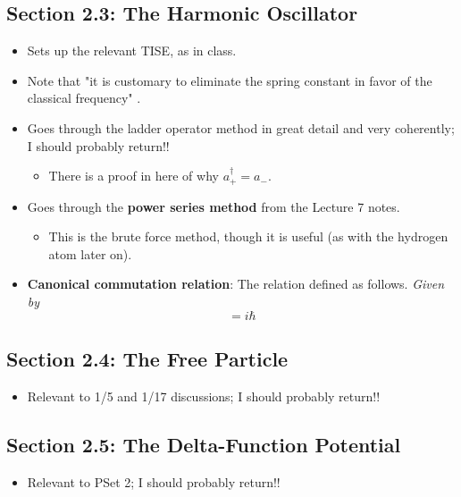 \documentclass[../notes.tex]{subfiles}
\begin{document}
\subsection*{Section 2.3: The Harmonic Oscillator}
\begin{itemize}
    \item {}Sets up the relevant TISE, as in class.
    \item Note that "it is customary to eliminate the spring constant in favor of the classical frequency" \parencite[58]{bib:Griffiths}.
    \item Goes through the ladder operator method in great detail and very coherently; I should probably return!!
    \begin{itemize}
        \item There is a proof in here of why $a_+^\dagger=a_-$.
    \end{itemize}
    \item Goes through the \textbf{power series method} from the Lecture 7 notes.
    \begin{itemize}
        \item This is the brute force method, though it is useful (as with the hydrogen atom later on).
    \end{itemize}
    \item \textbf{Canonical commutation relation}: The relation defined as follows. \emph{Given by}
    \begin{equation*}
        [\hat{x},\hat{\vec{p}}] = i\hbar
    \end{equation*}
\end{itemize}


\subsection*{Section 2.4: The Free Particle}
\begin{itemize}
    \item Relevant to 1/5 and 1/17 discussions; I should probably return!!
\end{itemize}


\subsection*{Section 2.5: The Delta-Function Potential}
\begin{itemize}
    \item Relevant to PSet 2; I should probably return!!
\end{itemize}
\end{document}
